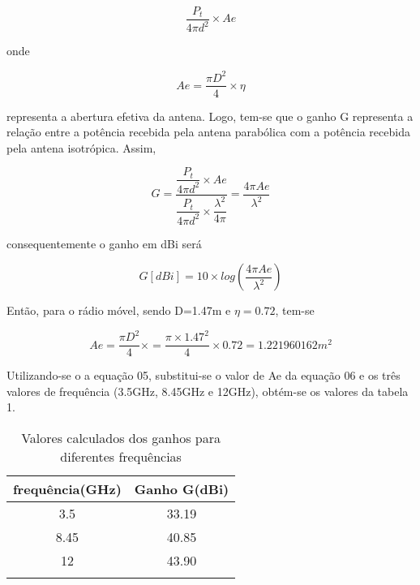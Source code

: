 \documentclass[a4paper,12pt]{article}
\begin{document}
\begin{equation}
  \dfrac{P_t}{4 \pi d^2} \times Ae
\end{equation}

 onde
 
 \begin{equation}
  Ae = \dfrac{\pi D^2}{4} \times \eta
 \end{equation}
 
 representa a abertura efetiva da antena. Logo, tem-se que o ganho G representa a
relação entre a potência recebida pela antena parabólica com a potência recebida
pela antena isotrópica. Assim,

\begin{equation}
 G = \dfrac{\dfrac{P_t}{4 \pi d^2} \times Ae}{ \dfrac{P_t}{4 \pi d^2} \times \dfrac{\lambda ^ 2}{4 \pi}} = \dfrac{4 \pi Ae}{\lambda^2} 
\end{equation}

consequentemente o ganho em dBi será

\begin{equation}
 G[dBi] = 10 \times log(\dfrac{4 \pi Ae}{\lambda^2})
\end{equation}

Então, para o rádio móvel, sendo D=1.47m e $\eta = 0.72$, tem-se

\begin{equation}
 Ae = \dfrac{\pi D^2}{4} \times = \dfrac{\pi \times 1.47^2}{4} \times 0.72 = 1.221960162 m^2
\end{equation}

Utilizando-se o a equação 05, substitui-se o valor de Ae da equação 06 e os três
valores de frequência (3.5GHz, 8.45GHz e 12GHz), obtém-se os valores da tabela
1.
\begin{table}[!h]
  \begin{center}
    \caption{Valores calculados dos ganhos para diferentes frequências} 
    \begin{tabular}{p{3in} p{3in}}\hline \hline
      \multicolumn{1}{c}{frequência(GHz)} & \multicolumn{1}{c}{Ganho G(dBi)}\\ \hline
      \multicolumn{1}{c}{3.5} & \multicolumn{1}{c}{33.19} \\ 
      \multicolumn{1}{c}{8.45} & \multicolumn{1}{c}{40.85} \\ 
      \multicolumn{1}{c}{12} & \multicolumn{1}{c}{43.90}\\ \hline
      &
    \end{tabular}
  \end{center}
\end{table}
\end{document}
